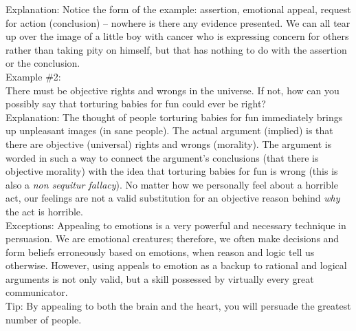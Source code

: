 \documentclass[a4paper,12pt,single,pdftex]{scrartcl}
\begin{document}
{    
      Explanation: Notice the form of the example: assertion, emotional appeal, request for action (conclusion) -- nowhere is there any evidence presented.  We can all tear up over the image of a little boy with cancer who is expressing concern for others rather than taking pity on himself, but that has nothing to do with the assertion or the conclusion.
    \\

    
      Example \#2:
    \\

    
      There must be objective rights and wrongs in the universe.  If not, how can you possibly say that torturing babies for fun could ever be right?
    \\

    
      Explanation: The thought of people torturing babies for fun immediately brings up unpleasant images (in sane people).  The actual argument (implied) is that there are objective (universal) rights and wrongs (morality).  The argument is worded in such a way to connect the argument's conclusions (that there is objective morality) with the idea that torturing babies for fun is wrong (this is also a {\it non sequitur  fallacy}).  No matter how we personally feel about a horrible act, our feelings are not a valid substitution for an objective reason behind {\it why}  the act is horrible.
    \\

    
      Exceptions: Appealing to emotions is a very powerful and necessary technique in persuasion.  We are emotional creatures; therefore, we often make decisions and form beliefs erroneously based on emotions, when reason and logic tell us otherwise.  However, using appeals to emotion as a backup to rational and logical arguments is not only valid, but a skill possessed by virtually every great communicator. 
    \\

    
      Tip: By appealing to both the brain and the heart, you will persuade the greatest number of people.
    \\

  }
\end{document}
